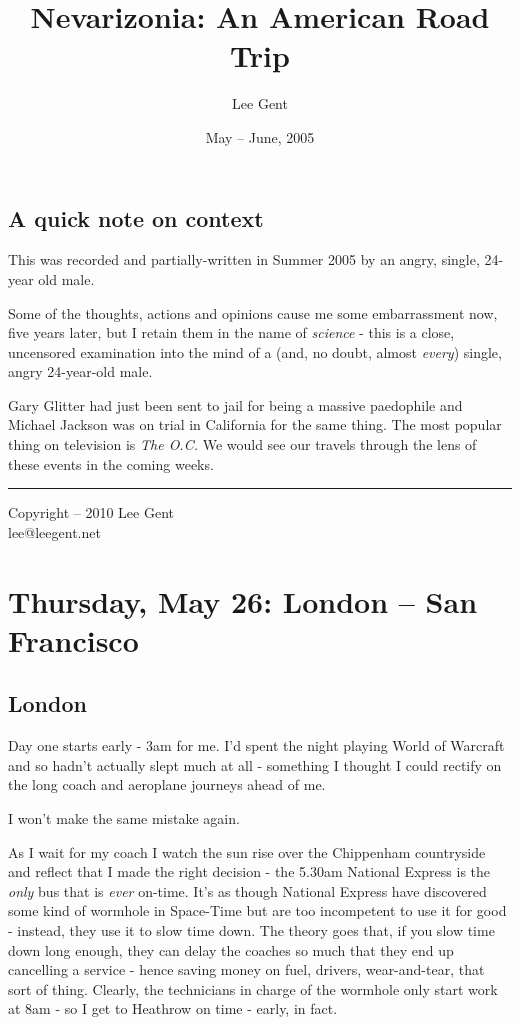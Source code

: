 \documentclass[a5paper,titlepage,11pt]{book}
\title{Nevarizonia: An American Road Trip}
\author{Lee Gent}
\date{May -- June, 2005}
\begin{document}
\frontmatter
\maketitle

\pagestyle{plain}
\section*{A quick note on context}
This was recorded and partially-written in Summer 2005 by an angry, single, 24-year old male.

Some of the thoughts, actions and opinions cause me some embarrassment now, five years later, but I retain them in the name of \emph{science} - this is a close, uncensored examination into the mind of a (and, no doubt, almost \emph{every}) single, angry 24-year-old male.

Gary Glitter had just been sent to jail for being a massive paedophile and Michael Jackson was on trial in California for the same thing. The most popular thing on television is \emph{The O.C.} We would see our travels through the lens of these events in the coming weeks.

\vfill
\hrule
\begin{center} {\scriptsize Copyright  -- 2010 Lee Gent \\ lee@leegent.net }  \end{center}

\mainmatter
\chapter[London -- San Francisco]{Thursday, May 26: London -- San Francisco}
\section*{London}
Day one starts early - 3am for me. I'd spent the night playing World of Warcraft and so hadn't actually slept much at all - something I thought I could rectify on the long coach and aeroplane journeys ahead of me.

I won't make the same mistake again.

As I wait for my coach I watch the sun rise over the Chippenham countryside and reflect that I made the right decision - the 5.30am National Express is the \emph{only} bus that is \emph{ever} on-time. It's as though National Express have discovered some kind of wormhole in Space-Time but are too incompetent to use it for good - instead, they use it to slow time down. The theory goes that, if you slow time down long enough, they can delay the coaches so much that they end up cancelling a service - hence saving money on fuel, drivers, wear-and-tear, that sort of thing. Clearly, the technicians in charge of the wormhole only start work at 8am - so I get to Heathrow on time - early, in fact.
\end{document}
